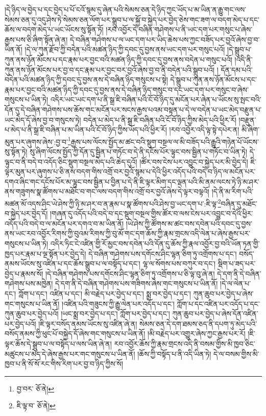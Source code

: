 །དེ་ཉིད་ལ་བྱེད་པ་དང་བྱེད་པ་པོ་ངའོ་སྙམ་དུ་ཞེན་པའི་སེམས་ཅན་དེ་ཉིད་ཀྱང་ཡོད་པ་མ་ཡིན་ན་རྒྱུ་གང་ལས་སེམས་ཅན་དུ་འདུ་ཤེས་ཏེ་སེམས་ཅན་ལོག་པར་སྒྲུབ་པ་ལ་སྐྱོ་བ་སྐྱེད་པར་བྱེད་ཅེས་གང་ཟག་ལ་བདག་མེད་པ་དང་ཆོས་ལ་བདག་མེད་པ་ཡང་ཡོངས་སུ་སྟོན་ཏོ། །རབ་འབྱོར་དེ་བཞིན་གཤེགས་པ་ནི་ཡང་དག་པར་གསུང་པ་ཞེས་རྒྱས་པས་ཅི་ཞིག་སྟོན་ཞེ་ན། དེ་བཞིན་གཤེགས་པ་ལ་ཡང་དག་པར་ཡིད་ཆེས་པས་ཀྱང་བཟོད་པར་བྱའོ་ཞེས་བྱ་བ་ཡིན་ནོ། །དེ་ལ་ཀུན་རྫོབ་ཀྱི་བདེན་པའི་མཚན་ཉིད་ཀྱི་དབང་དུ་བྱས་ནས་ཡང་དག་པར་གསུང་པའོ། །དེ་སྒྲུབ་པ་ཀུན་ནས་ཉོན་མོངས་པ་དང་རྣམ་པར་བྱང་བའི་མཚན་ཉིད་ཀྱི་དབང་དུ་བྱས་ནས་བདེན་པ་གསུང་པའོ། །འདི་ནི་ཀུན་ནས་ཉོན་མོངས་པར་བྱ་བ་དང་རྣམ་པར་བྱང་བར་བྱའོ་ཞེས་བྱ་བ་ནི་བདེན་པའི་སྒྲུབ་པའོ། །
དོན་དམ་པའི་བདེན་པའི་མཚན་ཉིད་ཀྱི་དབང་དུ་བྱས་ནས་དེ་བཞིན་ཉིད་གསུངས་པ་སྟེ། དེ་སྒྲུབ་པ་ཀུན་ནས་ཉོན་མོངས་པ་དང་རྣམ་པར་བྱང་བའི་མཚན་ཉིད་ཀྱི་དབང་དུ་བྱས་ནས་དེ་བཞིན་ཉིད་གསུང་བ་དང་ཡང་དག་པར་གསུང་བ་ཞེས་གསུངས་པ་ཡིན་ཏེ། འདིར་ཡང་ཡང་དག་པ་ནི་སྒྲ་ཇི་བཞིན་པའི་ངོ་བོ་ཉིད་དུ་མངོན་པར་ཞེན་པ་ཡོངས་སུ་སྤང་བའི་དོན་དུ་དེ་བཞིན་གཤེགས་པས་ཆོས་གང་མངོན་པར་སངས་རྒྱས་པའམ་བསྟན་པ་དེ་ལ་བདེན་པ་ཡང་མེད་བརྫུན་པ་ཡང་མེད་དོ་ཞེས་བྱ་བ་གསུངས་ཏེ། བདེན་པ་མེད་པ་ནི་སྒྲ་ཇི་བཞིན་པའི་ངོ་བོ་ཉིད་ཀྱིས་མེད་པའི་ཕྱིར་རོ། །བརྫུན་པ་མེད་པ་ནི་སྒྲ་ཇི་བཞིན་པ་མ་ཡིན་པའི་ངོ་བོ་ཉིད་ཀྱིས་ཡོད་པའི་ཕྱིར་རོ། །རབ་འབྱོར་འདི་ལྟ་སྟེ་དཔེར་ན། མི་ཞིག་མུན་པར་ཞུགས་ཞེས་:བྱ་བ་\footnote{བྱ་བར་  ཅོ་ནེ། }རྒྱས་པས་ལོངས་སྤྱོད་མ་ཚང་བའི་སྡུག་བསྔལ་ལ་མི་བཟོད་པའི་རྒྱུའི་གཉེན་པོ་ཡོངས་སུ་སྟོན་ཏེ། སུ་ཞིག་ལོངས་སྤྱོད་ཀྱི་དོན་དུ་སྦྱིན་པ་གཏོང་བ་དེ་ནི་དངོས་པོར་ལྟུང་བས་སྦྱིན་པ་གཏོང་བ་ཡིན་ཏེ། དེ་ལྟུང་བ་ནི་བདེ་བ་འདོད་ཅིང་སྡུག་བསྔལ་མེད་པའི་ཆེད་དུའོ། །ཚོར་བས་ངེས་པར་འབྱུང་བ་སྐྱེད་པར་མི་བྱེད་དེ། ཇི་ལྟར་མུན་པར་ཞུགས་པ་ཅི་ནས་བདག་གིས་འགྲོ་བར་བྱའོ་སྙམ་པ་དེའི་ཕྱིར་འདོད་པའི་བདེ་བ་ཉིད་ལ་མངོན་པར་དགའ་ཞིང་གང་དངོས་པོར་མ་ལྷུང་བས་སྦྱིན་པ་བྱིན་པ་དེ་ནི་ཇི་ལྟར་མིག་དང་ལྡན་པའི་མི་ནམ་ལངས་ཏེ་ཉི་མ་ཤར་ནས་གཟུགས་སྣ་ཚོགས་པ་མཐོང་བ་གང་ལས་བདག་གིས་འགྲོ་བར་བྱའོ་ཞེས་དེ་ལྟར་བལྟའོ། །དེ་ནི་མ་རིག་པའི་མཚན་མོ་འདས་ཤིང་ཡེ་ཤེས་ཀྱི་ཉི་མ་ཤར་བ་ན་རྣམ་པ་སྣ་ཚོགས་པའི་ཤེས་བྱ་ཡང་དག་པ་:ཇི་ལྟ་\footnote{ཇི་ལྟ་བ་  ཅོ་ནེ། }བཞིན་དུ་མཐོང་བ་སྐྱེད་པར་བྱེད་དོ། །གཞན་དུ་འདོད་པའི་བདེ་བ་དང་སྡུག་བསྔལ་གྱིས་ཚོར་བ་ལས་ངེས་པར་འབྱུང་བ་དེའི་ཕྱིར་འདོད་པའི་བདེ་བ་ལ་མངོན་པར་དགའ་བ་མ་ཡིན་ནོ། །ཡེ་ཤེས་ཀྱི་ཚོགས་མ་ཚང་བས་དབེན་པའི་དབང་དུ་བྱས་ནས་ཡང་རབ་འབྱོར་རིགས་ཀྱི་བུའམ་རིགས་ཀྱི་བུ་མོ་གང་དག་ཆོས་ཀྱི་རྣམ་གྲངས་འདི་ལེན་པ་ཞེས་རྒྱས་པར་གསུངས་པ་ཡིན་ཏེ། འདིར་ཏིང་ངེ་འཛིན་གྱི་རོ་མྱང་བས་དབེན་པའི་དོན་དུ་ཆོས་ཀྱི་རྣལ་འབྱོར་བྱ་བའི་ཡོན་ཏན་གྱི་ཁྱད་པར་རྣམ་པ་ལྔ་སྟོན་པར་བྱེད་དེ། དེ་བཞིན་གཤེགས་པས་དགོངས་ཤིང་ལྷན་ཅིག་ཏུ་འགྲོགས་པ་དང་། བསོད་ནམས་ཡོངས་སུ་འཛིན་པ་དང་ཆོས་སྒྲུབ་པ་ལ་བསྟོད་པ་དང་། ལྷ་ལ་སོགས་པས་བཀུར་བ་དང་། སྡིག་པ་ཟད་པར་བྱེད་པ་རྣམས་སོ། །དེ་བཞིན་གཤེགས་པས་དགོངས་ཤིང་ལྷན་ཅིག་ཏུ་འགྲོགས་པ་ཅི་ལྟ་བུ་ཞེ་ན། དེ་དག་ནི་དེ་བཞིན་གཤེགས་པས་མཁྱེན། དེ་དག་ནི་དེ་བཞིན་གཤེགས་པས་གཟིགས་ཞེས་གང་གསུངས་པ་ཡིན་ནོ། །དེ་ལ་ལེན་པ་དང་། ཀློག་པ་དང་། འཛིན་པ་དང་། མི་བརྗེད་པར་བྱེད་པ་དང་། སྨྲ་བར་བྱེད་པ་དང་། ཀུན་ཆུབ་པར་བྱེད་པ་ཞེས་གང་གསུངས་པ་ཡིན་ནོ། །འཛིན་པའི་གཟུངས་ཀྱི་རྒྱུ་ལེན་པར་འདོད་པ་དང་། ཀློག་པ་དང་འཛིན་པར་འདོད་པ་དང་ཀུན་ཆུབ་པར་བྱེད་པའོ། །ཡང་སྨྲ་བར་བྱེད་པ་དང་། ཀློག་པར་བྱེད་པ་དང་། ཀུན་ཆུབ་པར་བྱེད་པ་ཞེས་དོན་འཛིན་པར་བྱེད་པའོ། །ཇི་ལྟར་བསོད་ནམས་ཡོངས་སུ་འཛིན་ཞེ་ན། སེམས་ཅན་དེ་དག་ཐམས་ཅད་ནི་དཔག་ཏུ་མེད་པའི་བསོད་ནམས་ཀྱི་ཕུང་པོ་བསྐྱེད་དོ་ཞེས་གང་གསུངས་པ་ཡིན་ནོ། །མི་བརྗེད་པར་འགྱུར་ཞེས་ཀྱང་རྒྱས་པར་རོ། །ཇི་ལྟར་ཆོས་དེ་སྒྲུབ་པ་ལ་བསྟོད་པ་ལས་ཡིན་ཞེ་ན། རབ་འབྱོར་ཆོས་ཀྱི་རྣམ་གྲངས་འདི་ནི་བསམ་གྱིས་མི་ཁྱབ་ཅིང་མཚུངས་པ་མེད་དེ་ཞེས་རྒྱས་པར་གང་གསུངས་པ་ཡིན་ནོ། །ཆོས་ཀྱི་བསྟོད་པ་ནི་འདི་ཡིན་ཏེ། དེ་ལ་བསམ་གྱིས་མི་ཁྱབ་པ་ནི་སོ་སོ་རང་གིས་རིག་པར་བྱ་བ་ཉིད་ཀྱིས་སོ། 
